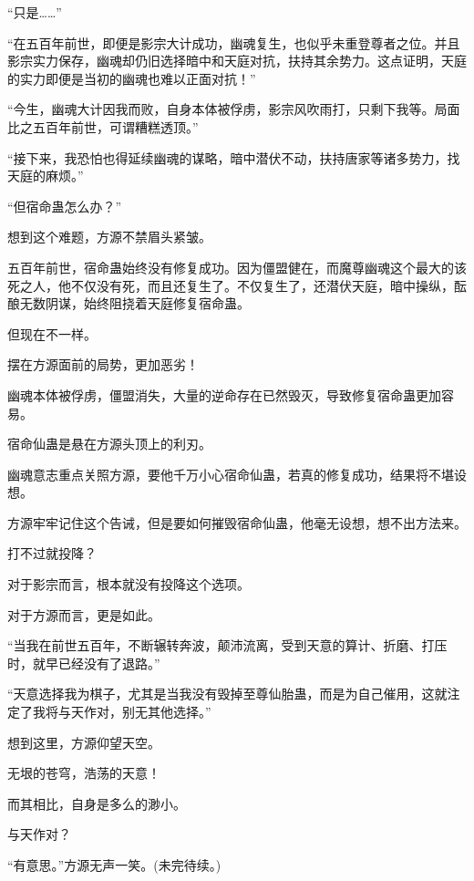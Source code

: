 \begin{this_body}
“只是……”

“在五百年前世，即便是影宗大计成功，幽魂复生，也似乎未重登尊者之位。并且影宗实力保存，幽魂却仍旧选择暗中和天庭对抗，扶持其余势力。这点证明，天庭的实力即便是当初的幽魂也难以正面对抗！”

“今生，幽魂大计因我而败，自身本体被俘虏，影宗风吹雨打，只剩下我等。局面比之五百年前世，可谓糟糕透顶。”

“接下来，我恐怕也得延续幽魂的谋略，暗中潜伏不动，扶持唐家等诸多势力，找天庭的麻烦。”

“但宿命蛊怎么办？”

想到这个难题，方源不禁眉头紧皱。

五百年前世，宿命蛊始终没有修复成功。因为僵盟健在，而魔尊幽魂这个最大的该死之人，他不仅没有死，而且还复生了。不仅复生了，还潜伏天庭，暗中操纵，酝酿无数阴谋，始终阻挠着天庭修复宿命蛊。

但现在不一样。

摆在方源面前的局势，更加恶劣！

幽魂本体被俘虏，僵盟消失，大量的逆命存在已然毁灭，导致修复宿命蛊更加容易。

宿命仙蛊是悬在方源头顶上的利刃。

幽魂意志重点关照方源，要他千万小心宿命仙蛊，若真的修复成功，结果将不堪设想。

方源牢牢记住这个告诫，但是要如何摧毁宿命仙蛊，他毫无设想，想不出方法来。

打不过就投降？

对于影宗而言，根本就没有投降这个选项。

对于方源而言，更是如此。

“当我在前世五百年，不断辗转奔波，颠沛流离，受到天意的算计、折磨、打压时，就早已经没有了退路。”

“天意选择我为棋子，尤其是当我没有毁掉至尊仙胎蛊，而是为自己催用，这就注定了我将与天作对，别无其他选择。”

想到这里，方源仰望天空。

无垠的苍穹，浩荡的天意！

而其相比，自身是多么的渺小。

与天作对？

“有意思。”方源无声一笑。(未完待续。)

\end{this_body}

